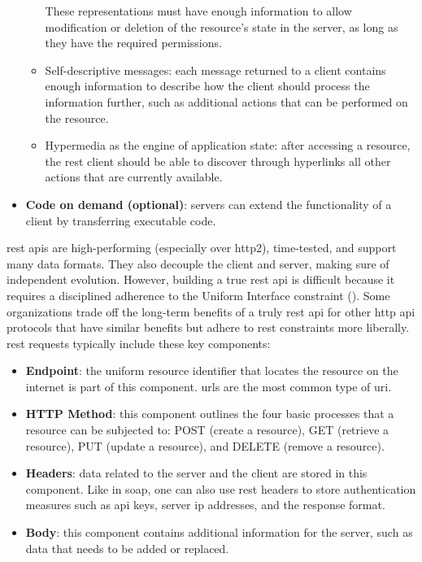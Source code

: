 \begin{multicols}{2}
\begin{itemize}
\begin{itemize}
                              These representations must have enough information to allow modification or deletion of the resource's
                              state in the server, as long as they have the required permissions.
                        \item Self-descriptive messages: each message returned to a client contains enough information to describe
                              how the client should process the information further, such as additional actions that can be
                              performed on the resource.
                        \item Hypermedia as the engine of application state: after accessing a resource, the \acrshort{rest} client
                              should be able to discover through hyperlinks all other actions that are currently available.
                  \end{itemize}
            \item \textbf{Code on demand (optional)}: servers can extend the functionality of a client by transferring
                  executable code.
      \end{itemize}
      \acrshort{rest} \acrshort{api}s are high-performing (especially over \acrshort{http}2), time-tested, and support
      many data formats. They also decouple the client and server, making sure of independent evolution. However,
      building a true \acrshort{rest} \acrshort{api} is difficult because it requires a disciplined adherence to the
      Uniform Interface constraint (\cite{restapiuniforminterface}). Some organizations trade off the long-term benefits
      of a truly \acrshort{rest} \acrshort{api} for other \acrshort{http} \acrshort{api} protocols that have similar
      benefits but adhere to \acrshort{rest} constraints more liberally. \acrshort{rest} requests typically include these
      key components:
      \begin{itemize}
            \item \textbf{Endpoint}: the uniform resource identifier that locates the resource on the internet is
                  part of this component. \acrshort{url}s are the most common type of \acrshort{uri}.
            \item \textbf{HTTP Method}: this component outlines the four basic processes that a resource can be subjected
                  to: POST (create a resource), GET (retrieve a resource), PUT (update a resource), and DELETE
                  (remove a resource).
            \item \textbf{Headers}: data related to the server and the client are stored in this component. Like in
                  \acrshort{soap}, one can also use \acrshort{rest} headers to store authentication measures such as
                  \acrshort{api} keys, server \acrshort{ip} addresses, and the response format.
            \item \textbf{Body}: this component contains additional information for the server, such as data that needs to
                  be added or replaced.
      \end{itemize}
\end{multicols}
